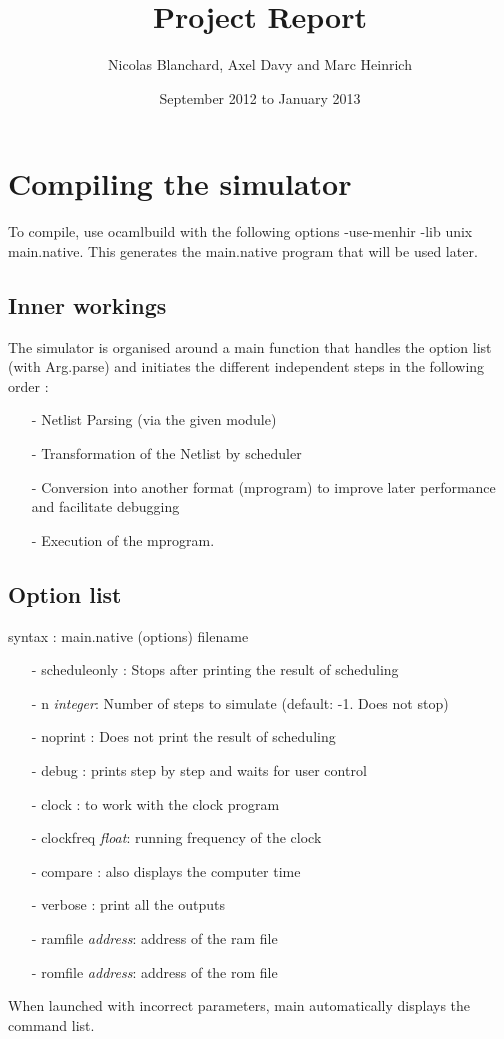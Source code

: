 \documentclass[a4paper]{article}
\author{Nicolas Blanchard, Axel Davy and Marc Heinrich}
\title{Project Report}
\date{September 2012 to January 2013}
\begin{document}
\maketitle
\section{Compiling the simulator}
	To compile, use ocamlbuild with the following options \newline
        -use-menhir -lib unix main.native. 
        This generates the main.native program that will be used later.


\subsection{Inner workings}
The simulator is organised around a main function that handles the option list (with Arg.parse) and initiates the different independent steps in the following order :
\begin{itemize}
     \item[-] { Netlist Parsing (via the given module)}
     \item[-] {Transformation of the Netlist by scheduler}
     \item[-] {Conversion into another format (mprogram) to improve later performance and facilitate debugging}
     \item[-] {Execution of the mprogram.}
\end{itemize}
\subsection{Option list}
syntax : main.native (options) filename
\begin{itemize}
     \item[-]{scheduleonly : Stops after printing the result of scheduling}
     \item[-] {n \textit{integer}: Number of steps to simulate (default:
         -1. Does not stop)}
     \item[-] {noprint : Does not print the result of scheduling}
     \item[-] {debug : prints step by step and waits for user control}
     \item[-] {clock : to work with the clock program}
     \item[-] {clockfreq \textit{float}: running frequency of the clock}
     \item[-] {compare : also displays the computer time}
     \item[-] {verbose : print all the outputs }
     \item[-] {ramfile \textit{address}: address of the ram file}
     \item[-] {romfile \textit{address}: address of the rom file}
\end{itemize}
When launched with incorrect parameters, main automatically displays the command list.
\end{document}
